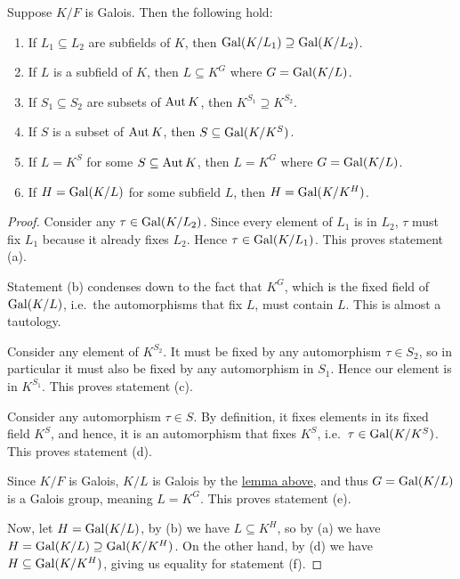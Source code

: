 \begin{lemma}\label{lem:galois-group-properties}
    Suppose \(K/F\) is Galois. Then the following hold:
    \begin{enumerate}[label={(\alph*)}, itemsep=0mm]
        \item If \(L_1 \subseteq L_2\) are subfields of \(K\),
            then \(\operatorname{Gal}(K/L_1) \supseteq \operatorname{Gal}(K/L_2)\).
        \item If \(L\) is a subfield of \(K\),
            then \(L \subseteq K^G\) where \(G = \operatorname{Gal}(K/L)\).
        \item If \(S_1 \subseteq S_2\) are subsets of \(\operatorname{Aut} K\),
            then \(K^{S_1} \supseteq K^{S_2}\).
        \item If \(S\) is a subset of \(\operatorname{Aut} K\),
            then \(S \subseteq \operatorname{Gal}(K/K^S)\).
        \item If \(L = K^S\) for some \(S \subseteq \operatorname{Aut} K\),
            then \(L = K^G\) where \(G = \operatorname{Gal}(K/L)\).
        \item If \(H = \operatorname{Gal}(K/L)\) for some subfield \(L\),
            then \(H = \operatorname{Gal}(K/K^H)\).
    \end{enumerate}
\end{lemma}
\begin{proof}
    Consider any \(\tau \in \operatorname{Gal}(K/L_2)\).
    Since every element of \(L_1\) is in \(L_2\),
    \(\tau\) must fix \(L_1\) because it already fixes \(L_2\).
    Hence \(\tau \in \operatorname{Gal}(K/L_1)\).
    This proves statement (a).

    Statement (b) condenses down to the fact that \(K^G\),
    which is the fixed field of \(\operatorname{Gal}(K/L)\),
    i.e.\ the automorphisms that fix \(L\),
    must contain \(L\).
    This is almost a tautology.

    Consider any element of \(K^{S_2}\).
    It must be fixed by any automorphism \(\tau \in S_2\),
    so in particular it must also be fixed by any automorphism in \(S_1\).
    Hence our element is in \(K^{S_1}\).
    This proves statement (c).

    Consider any automorphism \(\tau \in S\).
    By definition, it fixes elements in its fixed field \(K^S\),
    and hence, it is an automorphism that fixes \(K^S\),
    i.e.\ \(\tau \in \operatorname{Gal}(K/K^S)\).
    This proves statement (d).

    Since \(K/F\) is Galois, \(K/L\) is Galois by the \hyperref[lem:galois-injective]{lemma above},
    and thus \(G = \operatorname{Gal}(K/L)\) is a Galois group, meaning \(L = K^G\).
    This proves statement (e).

    Now, let \(H = \operatorname{Gal}(K/L)\), by (b) we have \(L \subseteq K^H\),
    so by (a) we have \(H = \operatorname{Gal}(K/L) \supseteq \operatorname{Gal}(K/K^H)\).
    On the other hand, by (d) we have \(H \subseteq \operatorname{Gal}(K/K^H)\),
    giving us equality for statement (f).
\end{proof}
